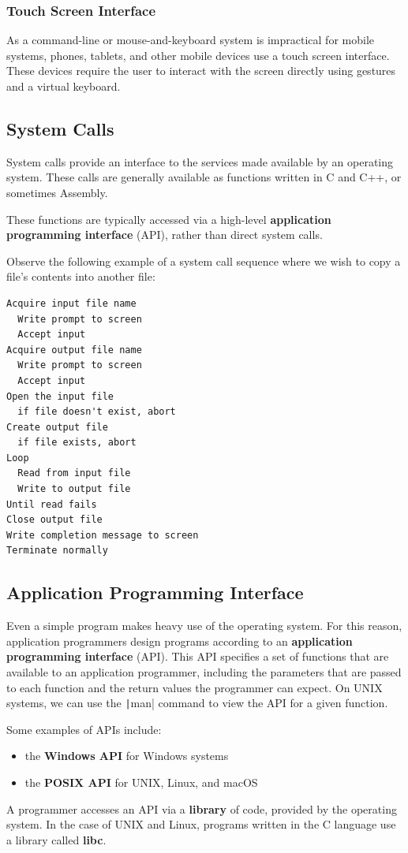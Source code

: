 \documentclass{article}
\begin{document}
\subsubsection{Touch Screen Interface}
As a command-line or mouse-and-keyboard system is impractical for
mobile systems, phones, tablets, and other mobile devices use a touch
screen interface. These devices require the user to interact with the
screen directly using gestures and a virtual keyboard.
\subsection{System Calls}
System calls provide an interface to the services made available by an
operating system. These calls are generally available as functions
written in C and C++, or sometimes Assembly.

These functions are typically accessed via a high-level
\textbf{application programming interface} (API), rather than direct
system calls.

Observe the following example of a system call sequence where we wish
to copy a file's contents into another file:
\begin{verbatim}
Acquire input file name
  Write prompt to screen
  Accept input
Acquire output file name
  Write prompt to screen
  Accept input
Open the input file
  if file doesn't exist, abort
Create output file
  if file exists, abort
Loop
  Read from input file
  Write to output file
Until read fails
Close output file
Write completion message to screen
Terminate normally
\end{verbatim}
\subsection{Application Programming Interface}
Even a simple program makes heavy use of the operating system. For this
reason, application programmers design programs according to an
\textbf{application programming interface} (API). This API specifies a
set of functions that are available to an application programmer,
including the parameters that are passed to each function and the
return values the programmer can expect. On UNIX systems, we can use
the \texttt|man| command to view the API for a given
function.

Some examples of APIs include:
\begin{itemize}
    \item the \textbf{Windows API} for Windows systems
    \item the \textbf{POSIX API} for UNIX, Linux, and macOS
\end{itemize}
A programmer accesses an API via a \textbf{library} of code, provided by
the operating system.
In the case of UNIX and Linux, programs written in the C language use a
library called \textbf{libc}.
\end{document}
